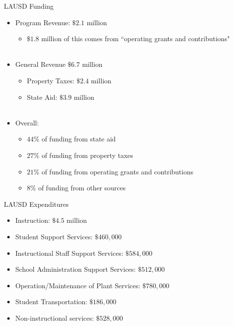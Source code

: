 \documentclass{beamer}
\begin{document}
\begin{frame}{LAUSD Funding}
\begin{itemize}
\item Program Revenue: $\$2.1$ million
	\begin{itemize}
	\item $\$1.8$ million of this comes from ``operating grants and contributions" \\~\\
	\end{itemize}
\item General Revenue $\$6.7$ million
	\begin{itemize}
	\item Property Taxes: $\$2.4$ million
	\item State Aid: $\$3.9$ million \\~\\
	\end{itemize}
\item Overall:
	\begin{itemize}
	\item $44\%$ of funding from state aid
	\item $27\%$ of funding from property taxes
	\item $21\%$ of funding from operating grants and contributions
	\item $8\%$ of funding from other sources
	\end{itemize}
\end{itemize}
\end{frame}

\begin{frame}{LAUSD Expenditures}
\begin{itemize}
\item Instruction: $\$4.5$ million
\item Student Support Services: $\$460,000$
\item Instructional Staff Support Services: $\$584,000$
\item School Administration Support Services: $\$512,000$
\item Operation/Maintenance of Plant Services: $\$780,000$
\item Student Transportation: $\$186,000$
\item Non-instructional services: $\$528,000$
\end{itemize}
\end{frame}
\end{document}
